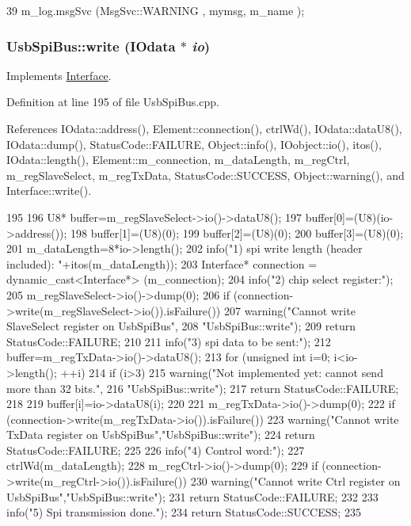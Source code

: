 \begin{DoxyCode}
39 { m_log.msgSvc (MsgSvc::WARNING , mymsg, m_name ); }
\end{DoxyCode}
\hypertarget{classUsbSpiBus_a3ac9d6f5053ddb8b2f8336f2aa88934e}{
\subsubsection[{write}]{ UsbSpiBus::write ({\bf IOdata} $\ast$ {\em io})}}
\label{classUsbSpiBus_a3ac9d6f5053ddb8b2f8336f2aa88934e}


Implements \hyperlink{classInterface_ad665cacbaf490a26c1c4ba192022e68a}{Interface}.

Definition at line 195 of file UsbSpiBus.cpp.

References IOdata::address(), Element::connection(), ctrlWd(), IOdata::dataU8(), IOdata::dump(), StatusCode::FAILURE, Object::info(), IOobject::io(), itos(), IOdata::length(), Element::m\_\-connection, m\_\-dataLength, m\_\-regCtrl, m\_\-regSlaveSelect, m\_\-regTxData, StatusCode::SUCCESS, Object::warning(), and Interface::write().


\begin{DoxyCode}
195                                      {
196   U8* buffer=m_regSlaveSelect->io()->dataU8();
197   buffer[0]=(U8)(io->address());
198   buffer[1]=(U8)(0);
199   buffer[2]=(U8)(0);
200   buffer[3]=(U8)(0);
201   m_dataLength=8*io->length();
202   info("1) spi write length (header included): "+itos(m_dataLength));
203   Interface* connection = dynamic_cast<Interface*> (m_connection);
204   info("2) chip select register:");
205   m_regSlaveSelect->io()->dump(0);
206   if (connection->write(m_regSlaveSelect->io()).isFailure()){
207     warning("Cannot write SlaveSelect register on UsbSpiBus",
208         "UsbSpiBus::write");
209     return StatusCode::FAILURE;
210   }
211   info("3) spi data to be sent:");
212   buffer=m_regTxData->io()->dataU8();
213   for (unsigned int i=0; i<io->length(); ++i) {
214     if (i>3) {
215       warning("Not implemented yet: cannot send more than 32 bits.",
216           "UsbSpiBus::write");
217       return StatusCode::FAILURE;
218     }
219     buffer[i]=io->dataU8(i);
220   }  
221   m_regTxData->io()->dump(0);
222   if (connection->write(m_regTxData->io()).isFailure()){
223     warning("Cannot write TxData register on UsbSpiBus","UsbSpiBus::write");
224     return StatusCode::FAILURE;
225   }
226   info("4) Control word:");
227   ctrlWd(m_dataLength);
228   m_regCtrl->io()->dump(0);
229   if (connection->write(m_regCtrl->io()).isFailure()){
230     warning("Cannot write Ctrl register on UsbSpiBus","UsbSpiBus::write");
231     return StatusCode::FAILURE;
232   }
233   info("5) Spi transmission done.");
234   return StatusCode::SUCCESS;
235 }
\end{DoxyCode}


